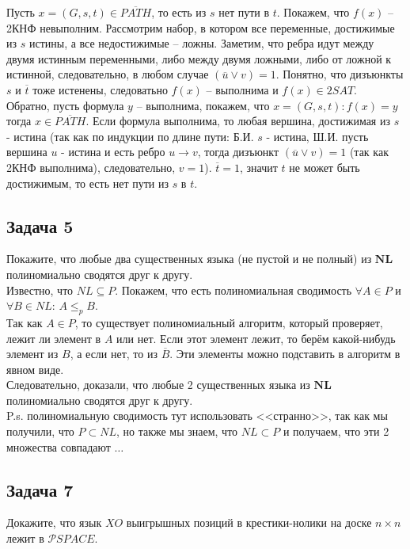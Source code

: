 \documentclass[a4paper,12pt]{article} %
\begin{document}
Пусть $ x= (G, s, t) \in \overline{PATH}$, то есть из $ s $ нет пути в $ t $. Покажем, что $ f(x) $ -- 2КНФ невыполним. Рассмотрим набор, в котором все переменные, достижимые из $ s $ истины, а все недостижимые -- ложны. Заметим, что ребра идут между двумя истинным переменными, либо между двумя ложными, либо от ложной к истинной, следовательно, в любом случае $ (\overline{u} \vee v) = 1$. Понятно, что дизъюнкты $ s $ и $ \overline{t} $ тоже истенены, следоватьно $ f(x) $ -- выполнима и $ f(x) \in 2SAT $.\\

Обратно, пусть формула $ y $ -- выполнима, покажем, что $ x = (G, s, t): f(x) = y $ тогда $ x \in \overline{PATH} $. Если формула выполнима, то любая вершина, достижимая из $ s $ - истина (так как по индукции по длине пути: Б.И. $ s $ - истина, Ш.И. пусть вершина $ u $ - истина и есть ребро $ u \rightarrow v $, тогда дизъюнкт $ (\overline{u} \vee v) = 1 $ (так как 2КНФ выполнима), следовательно, $ v = 1$). $ \overline{t} = 1$, значит $ t $ не может быть достижимым, то есть нет пути из $ s $ в $ t $.

\subsection*{Задача 5}
Покажите, что любые два существенных языка
(не пустой и не полный) из $\mathbf{NL}$ полиномиально сводятся друг к другу.\\

Известно, что $ NL \subseteq P $. Покажем, что есть полиномиальная сводимость $ \forall A \in P $ и $ \forall B \in NL $: $ A \leq_p B $.\\
Так как $ A \in P $, то существует полиномиальный алгоритм, который проверяет, лежит ли элемент в $ A $ или нет. Если этот элемент лежит, то берём какой-нибудь элемент из $ B $, а если нет, то из $ \overline{B} $. Эти элементы можно подставить в алгоритм в явном виде.\\
Следовательно, доказали, что любые 2 существенных языка из $\mathbf{NL}$ полиномиально сводятся друг к другу.\\
P.s. полиномиальную сводимость тут использовать <<странно>>, так как мы получили, что $ P \subset NL $, но также мы знаем, что $ NL \subset P $ и получаем, что эти 2 множества совпадают $ \ldots $


\subsection*{Задача 7}
Докажите, что язык $XO$ выигрышных позиций в крестики-нолики на доске $n\times n$ лежит в $\mathcal{P}SPACE$.\\
\end{document}
